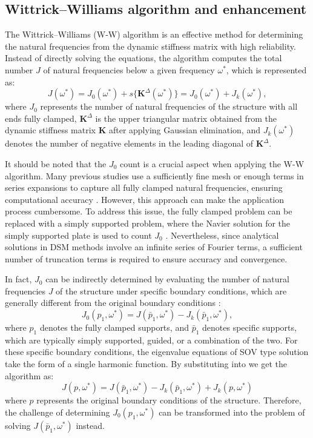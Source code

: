 \documentclass[preprint,12pt,number]{elsarticle}
\begin{document}
\subsection{Wittrick–Williams algorithm and enhancement}\label{sec:WWA2}
The Wittrick–Williams (W-W) algorithm \cite{wittrick1971general} is an effective method for determining the natural frequencies from the dynamic stiffness matrix with high reliability. 
Instead of directly solving the equations, the algorithm computes the total number $J$ of natural frequencies below a given frequency $\omega^*$, which is represented as:
\begin{equation}\label{eq:WWalgorithm}
J(\omega^*) = J_0(\omega^*) + s\{\mathbf{K}^{\Delta}(\omega^*)\} = J_0(\omega^*) + J_k(\omega^*),
\end{equation}
where $J_0$ represents the number of natural frequencies of the structure with all ends fully clamped, $\mathbf{K}^{\Delta}$ is the upper triangular matrix obtained from the dynamic stiffness matrix $\mathbf{K}$ after applying Gaussian elimination, and $J_k(\omega^*)$ denotes the number of negative elements in the leading diagonal of $\mathbf{K}^{\Delta}$.

It should be noted that the $J_0$ count is a crucial aspect when applying the W-W algorithm. Many previous studies use a sufficiently fine mesh or enough terms in series expansions to capture all fully clamped natural frequencies, ensuring computational accuracy \cite{banerjee2015dynamic}. However, this approach can make the application process cumbersome. 
To address this issue, the fully clamped problem can be replaced with a simply supported problem, where the Navier solution for the simply supported plate is used to count $J_0$ \citep{liu2015exact}. 
Nevertheless, since analytical solutions in DSM methods involve an infinite series of Fourier terms, a sufficient number of truncation terms is required to ensure accuracy and convergence.   


In fact, $ J_0 $ can be indirectly determined by evaluating the number of natural frequencies $ J $ of the structure under specific boundary conditions, which are generally different from the original boundary conditions \cite{han2018improved}:
%
\begin{equation}\label{eq:J_o_pin}
J_0(p_1,\omega^*) = J(\bar{p}_1,\omega^*) - J_k(\bar{p}_1,\omega^*),
\end{equation}
%
where $ p_1 $ denotes the fully clamped supports, and $ \bar{p}_1 $ denotes specific supports, which are typically simply supported, guided, or a combination of the two.
For these specific boundary conditions, the eigenvalue equations of SOV type solution take the form of a single harmonic function.
By substituting  into  we get the algorithm as:  
%
\begin{equation}\label{eq:new_WWalgorithm}
J(p,\omega^*) = J(\bar{p}_1,\omega^*) - J_k(\bar{p}_1,\omega^*) + J_k(p,\omega^*)
\end{equation} 
%
where $p$ represents the original boundary conditions of the structure.
Therefore, the challenge of determining $J_0(p_1, \omega^*)$ can be transformed into the problem of solving $ J(\bar{p}_1, \omega^*)$ instead. 
\end{document}
